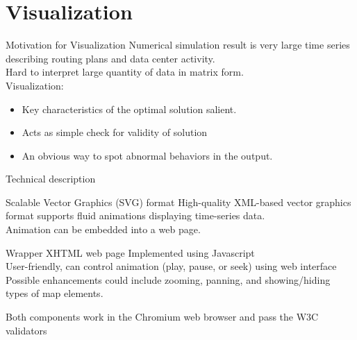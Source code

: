 \documentclass[xcolor=dvipsnames]{beamer}
\begin{document}
\section{Visualization}
\begin{frame}{Motivation for Visualization}
Numerical simulation result is very large time series describing routing plans and data center activity. \\
\vspace{2mm}
Hard to interpret large quantity of data in matrix form. \\
\vspace{2mm}
Visualization:  
	\begin{itemize}
	\item Key characteristics of the optimal solution salient.
	\item Acts as simple check for validity of solution
	\item An obvious way to spot abnormal behaviors in the output.
	\end{itemize}
\end{frame}
\begin{frame}{Technical description}
 	\begin{block}{Scalable Vector Graphics (SVG) format}
	High-quality XML-based vector graphics format supports fluid animations displaying time-series data. \\ 
	Animation can be embedded into a web page.
	\begin{block}{Wrapper XHTML web page} 
	Implemented using Javascript \\	
	User-friendly, can control animation (play, pause, or seek) using web interface \\
	Possible enhancements could include zooming, panning, and showing/hiding types of map elements.
	\begin{block}{Both components work in the Chromium web browser and pass the W3C validators}
	\end{block}
	\end{block}
	\end{block}
\end{frame}
\end{document}
